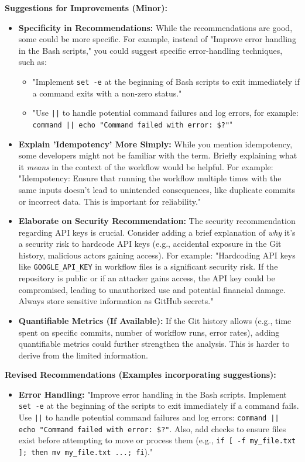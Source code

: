 \documentclass{article}
\begin{document}
\begin{itemize}
\begin{itemize}
\begin{itemize}
\textbf{Suggestions for Improvements (Minor):}

\begin{itemize}
    \item \textbf{Specificity in Recommendations:} While the recommendations are good, some could be more specific. For example, instead of "Improve error handling in the Bash scripts," you could suggest specific error-handling techniques, such as:
    \begin{itemize}
        \item "Implement \texttt{set -e} at the beginning of Bash scripts to exit immediately if a command exits with a non-zero status."
        \item "Use \texttt{||} to handle potential command failures and log errors, for example: \texttt{command || echo "Command failed with error: \$?"}"
    \end{itemize}
    \item \textbf{Explain 'Idempotency' More Simply:} While you mention idempotency, some developers might not be familiar with the term. Briefly explaining what it \textit{means} in the context of the workflow would be helpful. For example:  "Idempotency: Ensure that running the workflow multiple times with the same inputs doesn't lead to unintended consequences, like duplicate commits or incorrect data.  This is important for reliability."
    \item \textbf{Elaborate on Security Recommendation:}  The security recommendation regarding API keys is crucial.  Consider adding a brief explanation of \textit{why} it's a security risk to hardcode API keys (e.g., accidental exposure in the Git history, malicious actors gaining access). For example: "Hardcoding API keys like \texttt{GOOGLE\_API\_KEY} in workflow files is a significant security risk. If the repository is public or if an attacker gains access, the API key could be compromised, leading to unauthorized use and potential financial damage.  Always store sensitive information as GitHub secrets."
    \item \textbf{Quantifiable Metrics (If Available):} If the Git history allows (e.g., time spent on specific commits, number of workflow runs, error rates), adding quantifiable metrics could further strengthen the analysis.  This is harder to derive from the limited information.
\end{itemize}

\textbf{Revised Recommendations (Examples incorporating suggestions):}

\begin{itemize}
    \item \textbf{Error Handling:} "Improve error handling in the Bash scripts. Implement \texttt{set -e} at the beginning of the scripts to exit immediately if a command fails. Use \texttt{||} to handle potential command failures and log errors: \texttt{command || echo "Command failed with error: \$?"}.  Also, add checks to ensure files exist before attempting to move or process them (e.g., \texttt{if [ -f my\_file.txt ]; then mv my\_file.txt ...; fi})."


\end{itemize}
\end{itemize}
\end{itemize}
\end{itemize}
\end{document}
